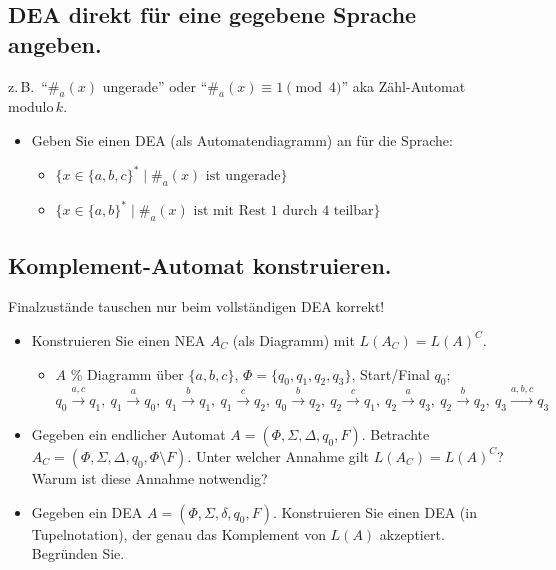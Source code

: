 \subsection{DEA direkt für eine gegebene Sprache angeben.} %
z.\,B.\ ``$\#_a(x)$ ungerade'' oder ``$\#_a(x)\equiv 1 \pmod 4$'' aka Zähl-Automat modulo\,$k$.
\begin{itemize}
    \item Geben Sie einen DEA (als Automatendiagramm) an für die Sprache:
    \begin{itemize}
        \item  $\{x\in\{a,b,c\}^*\mid \#_a(x)\text{ ist ungerade}\}$ 
        \item  $\{x\in\{a,b\}^*\mid \#_a(x)\text{ ist mit Rest }1\text{ durch }4\text{ teilbar}\}$ 
    \end{itemize}
\end{itemize}

\subsection{Komplement-Automat konstruieren.} %
Finalzustände tauschen nur beim vollständigen DEA korrekt!

\begin{itemize}
    \item Konstruieren Sie einen NEA $A_C$ (als Diagramm) mit $L(A_C)=L(A)^C$.
    \begin{itemize}
        \item $A$ \% Diagramm über $\{a,b,c\}$, $\Phi=\{q_0,q_1,q_2,q_3\}$, Start/Final $q_0$;
        $q_0\xrightarrow{a,c}q_1,\ q_1\xrightarrow{a}q_0,\ q_1\xrightarrow{b}q_1,\ q_1\xrightarrow{c}q_2,\ q_0\xrightarrow{b}q_2,\ q_2\xrightarrow{c}q_1,\ q_2\xrightarrow{a}q_3,\ q_2\xrightarrow{b}q_2,\ q_3\xrightarrow{a,b,c}q_3$ 
    \end{itemize}
    \item Gegeben ein endlicher Automat $A=(\Phi,\Sigma,\Delta,q_0,F)$.
    Betrachte $A_C=(\Phi,\Sigma,\Delta,q_0,\Phi\setminus F)$.
    Unter welcher Annahme gilt $L(A_C)=L(A)^C$? Warum ist diese Annahme notwendig? 
    \item Gegeben ein DEA $A=(\Phi,\Sigma,\delta,q_0,F)$.
    Konstruieren Sie einen DEA (in Tupelnotation),
    der genau das Komplement von $L(A)$ akzeptiert.
    Begründen Sie.  
\end{itemize}


